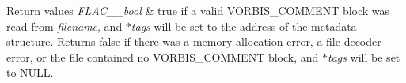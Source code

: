 \begin{DoxyRetVals}{Return values}
{\em F\+L\+A\+C\+\_\+\+\_\+bool} & {\ttfamily true} if a valid V\+O\+R\+B\+I\+S\+\_\+\+C\+O\+M\+M\+E\+NT block was read from {\itshape filename}, and {\itshape $\ast$tags} will be set to the address of the metadata structure. Returns {\ttfamily false} if there was a memory allocation error, a file decoder error, or the file contained no V\+O\+R\+B\+I\+S\+\_\+\+C\+O\+M\+M\+E\+NT block, and {\itshape $\ast$tags} will be set to {\ttfamily N\+U\+LL}. \\
\hline
\end{DoxyRetVals}
